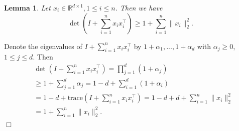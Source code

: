 \documentclass{article}
\newcommand{\RR}{\mathbb{R}}
\newcommand{\trace}{\mathrm{trace}}
\newcommand{\norm}[1]{\| #1 \|}
\newtheorem{lemma}[theorem]{Lemma}%
\newenvironment{proof}{\noindent {\textbf{Proof. }}}{$\Box$ \medskip}
\begin{document}
\begin{lemma} %
  \label{lem:detTech}
  Let $x_i \in \RR^{d \times 1}, 1 \leq i \leq n$. Then we have
  $$
    \det\left(I + \sum_{i=1}^n x_i x_i^{\top}\right) \geq 1 + \sum_{i=1}^n \norm{x_i}_2^2.
  $$
\end{lemma}
\begin{proof}
  Denote the eigenvalues of $I + \sum_{i=1}^n x_i x_i^{\top}$ by $1+\alpha_1,...,1+\alpha_d$ with $\alpha_j \geq 0$, $1\leq j\leq d$. Then
  \begin{align*}
    &\det(I + \sum_{i=1}^n x_i x_i^{\top})= \prod_{j=1}^d (1 + \alpha_j)\\
    &\geq 1 +\sum_{j=1}^d \alpha_j =1-d + \sum_{i=1}^d (1+\alpha_i) \\
    &=1-d + \trace(I + \sum_{i=1}^n x_i x_i^{\top})= 1-d + d + \sum_{i=1}^n \norm{x_i}_2^2\\
    &=1 + \sum_{i=1}^n \norm{x_i}_2^2.
  \end{align*}
\end{proof}
\end{document}
